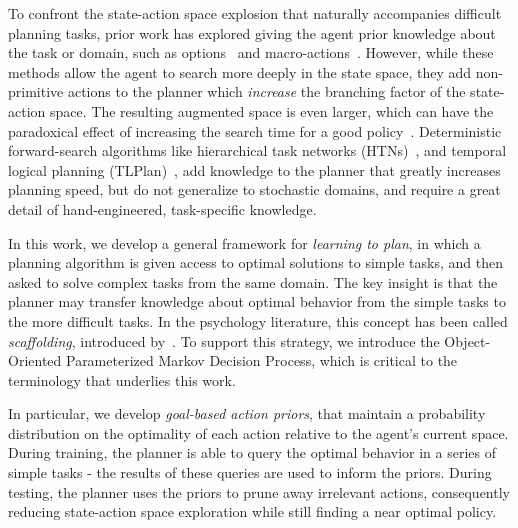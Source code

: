 \documentclass[11pt]{article}
\begin{document}
To confront the state-action space explosion that naturally accompanies difficult planning tasks, prior work has explored giving the agent prior knowledge about the task or domain, such as options~\cite{sutton99} and macro-actions~\cite{Botea:2005kx,Newton:2005vn}.  However, while these methods allow the agent to search more deeply in the state space, they add non-primitive actions to the planner which {\em increase} the branching factor of the state-action space.  The resulting augmented space is even larger, which can have the paradoxical effect of increasing the search time for a good policy~\cite{Jong:2008zr}. Deterministic forward-search algorithms like hierarchical task networks (HTNs)~\cite{Nau:1999:SSH:1624312.1624357}, and temporal logical planning (TLPlan)~\cite{Bacchus95usingtemporal,Bacchus99usingtemporal}, add knowledge to the planner that greatly increases planning speed, but do not generalize to stochastic domains, and require a great detail of hand-engineered, task-specific knowledge.

In this work, we develop a general framework for {\it learning to plan}, in which a planning algorithm is given access to optimal solutions to simple tasks, and then asked to solve complex tasks from the same domain. The key insight is that the planner may transfer knowledge about optimal behavior from the simple tasks to the more difficult tasks. In the psychology literature, this concept has been called {\it scaffolding}, introduced by~\cite{wood1976role}. To support this strategy, we introduce the Object-Oriented Parameterized Markov Decision Process, which is critical to the terminology that underlies this work.

In particular, we develop {\it goal-based action priors}, that maintain a probability distribution on the optimality of each action relative to the agent's current space. During training, the planner is able to query the optimal behavior in a series of simple tasks - the results of these queries are used to inform the priors. During testing, the planner uses the priors to prune away irrelevant actions, consequently reducing state-action space exploration while still finding a near optimal policy.
\end{document}
